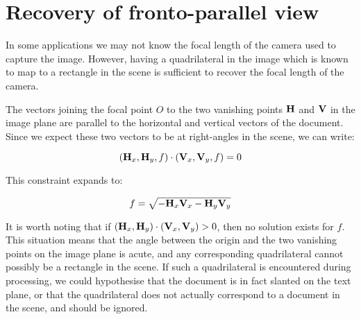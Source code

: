 \section{Recovery of fronto-parallel view} \label{sec-rectify}


In some applications we may not know the focal length of the camera used to capture the image.  However, having a quadrilateral in the image which is known to map to a rectangle in the scene is sufficient to recover the focal length of the camera.

The vectors joining the focal point $O$ to the two vanishing points ${ \bf H }$ and ${ \bf V }$ in the image plane are parallel to the horizontal and vertical vectors of the document.  Since we expect these two vectors to be at right-angles in the scene, we can write:

\begin{equation}
( { \bf H }_x , { \bf H }_y , f ) \cdot ( { \bf V }_x , { \bf V }_y , f ) = 0
\end{equation}

This constraint expands to:

\begin{equation}
f = \sqrt{ - { \bf H }_x { \bf V }_x - { \bf H }_y { \bf V }_y }
\end{equation}


It is worth noting that if $ ( { \bf H }_x , { \bf H }_y ) \cdot ( { \bf V }_x , { \bf V }_y ) > 0 $, then no solution exists for $f$.  This situation means that the angle between the origin and the two vanishing points on the image plane is acute, and any corresponding quadrilateral cannot possibly be a rectangle in the scene.  If such a quadrilateral is encountered during processing, we could hypothesise that the document is in fact slanted on the text plane, or that the quadrilateral does not actually correspond to a document in the scene, and should be ignored.

